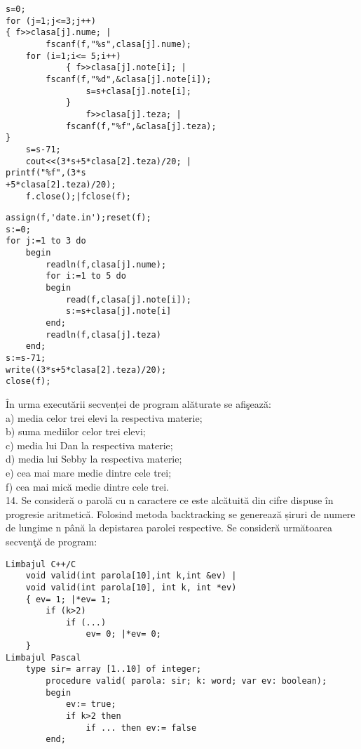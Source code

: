\begin{verbatim}
s=0;
for (j=1;j<=3;j++)
{ f>>clasa[j].nume; |
        fscanf(f,"%s",clasa[j].nume);
    for (i=1;i<= 5;i++)
            { f>>clasa[j].note[i]; |
        fscanf(f,"%d",&clasa[j].note[i]);
                s=s+clasa[j].note[i];
            }
                f>>clasa[j].teza; |
            fscanf(f,"%f",&clasa[j].teza);
}
    s=s-71;
    cout<<(3*s+5*clasa[2].teza)/20; |
printf("%f",(3*s
+5*clasa[2].teza)/20);
    f.close();|fclose(f);
\end{verbatim}

\begin{verbatim}
assign(f,'date.in');reset(f);
s:=0;
for j:=1 to 3 do
    begin
        readln(f,clasa[j].nume);
        for i:=1 to 5 do
        begin
            read(f,clasa[j].note[i]);
            s:=s+clasa[j].note[i]
        end;
        readln(f,clasa[j].teza)
    end;
s:=s-71;
write((3*s+5*clasa[2].teza)/20);
close(f);
\end{verbatim}

În urma executării secvenței de program alăturate se afişează:\\
a) media celor trei elevi la respectiva materie;\\
b) suma mediilor celor trei elevi;\\
c) media lui Dan la respectiva materie;\\
d) media lui Sebby la respectiva materie;\\
e) cea mai mare medie dintre cele trei;\\
f) cea mai mică medie dintre cele trei.\\
14. Se consideră o parolă cu n caractere ce este alcătuită din cifre dispuse în progresie aritmetică. Folosind metoda backtracking se generează șiruri de numere de lungime n până la depistarea parolei respective. Se consideră următoarea secvenţă de program:

\begin{verbatim}
Limbajul C++/C
    void valid(int parola[10],int k,int &ev) |
    void valid(int parola[10], int k, int *ev)
    { ev= 1; |*ev= 1;
        if (k>2)
            if (...)
                ev= 0; |*ev= 0;
    }
Limbajul Pascal
    type sir= array [1..10] of integer;
        procedure valid( parola: sir; k: word; var ev: boolean);
        begin
            ev:= true;
            if k>2 then
                if ... then ev:= false
        end;
\end{verbatim}

